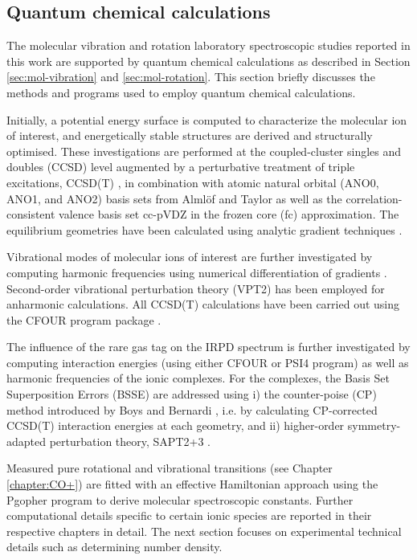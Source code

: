 \subsection{Quantum chemical calculations}
\label{sec:QC-calculations}
The molecular vibration and rotation laboratory spectroscopic studies reported in this work are supported by quantum chemical calculations as described in Section \ref{sec:mol-vibration} and \ref{sec:mol-rotation}. This section briefly discusses the methods and programs used to employ quantum chemical calculations.

Initially, a potential energy surface is computed to characterize the molecular ion of interest, and energetically stable structures are derived and structurally optimised. These investigations are performed at the coupled-cluster singles and doubles (CCSD) level augmented by a perturbative treatment of triple excitations, CCSD(T) \cite{raghavachari_fifth-order_1989}, in combination with atomic natural orbital (ANO0, ANO1, and ANO2) basis sets from Alml\"of and Taylor \cite{almlof_general_1987, almlof_atomic_1991} as well as the correlation-consistent valence basis set cc-pVDZ \cite{dunning_gaussian_1989} in the frozen core (fc) approximation. The equilibrium geometries have been calculated using analytic gradient techniques  \cite{watts_open-shell_1992}.

Vibrational modes of molecular ions of interest are further investigated by computing harmonic frequencies using numerical differentiation of gradients \cite{lee_analytic_1991, watts_coupledcluster_1993}. Second-order vibrational perturbation theory (VPT2) \cite{mills_32_1972} has been employed for anharmonic calculations. All CCSD(T) calculations have been carried out using the CFOUR program package  \cite{matthews_coupled-cluster_2020,harding_parallel_2008}.

The influence of the rare gas tag on the IRPD spectrum is further investigated by computing interaction energies (using either CFOUR \cite{matthews_coupled-cluster_2020} or PSI4 \cite{smith_psi4_2020} program) as well as harmonic frequencies of the ionic complexes. For the complexes, the Basis Set Superposition Errors (BSSE) \cite{liu_accurate_1973} are addressed using i) the counter-poise (CP) method introduced by Boys and Bernardi \cite{boys_calculation_1970}, i.e. by calculating CP-corrected CCSD(T) interaction energies at each geometry, and ii) higher-order symmetry-adapted perturbation theory, SAPT2+3 \cite{jeziorski_perturbation_1994, hohenstein_density_2010}. 

Measured pure rotational and vibrational transitions (see Chapter \ref{chapter:CO+}) are fitted with an effective Hamiltonian approach using the Pgopher program \cite{western_pgopher_2017} to derive molecular spectroscopic constants. Further computational details specific to certain ionic species are reported in their respective chapters in detail. The next section focuses on experimental technical details such as determining number density.
